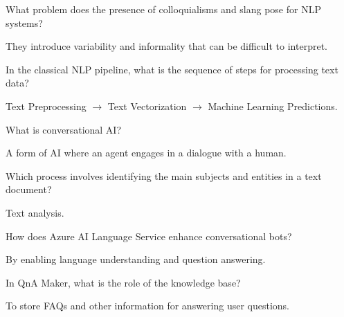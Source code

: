 \begin{qanda}
	\begin{question}
What problem does the presence of colloquialisms and slang pose for NLP systems?
	\end{question}
	\begin{answer}
They introduce variability and informality that can be difficult to interpret.
	\end{answer}
\end{qanda}

\begin{qanda}
	\begin{question}
In the classical NLP pipeline, what is the sequence of steps for processing text data?
	\end{question}
	\begin{answer}
Text Preprocessing $\rightarrow{}$ Text Vectorization $\rightarrow{}$ Machine Learning Predictions.
	\end{answer}
\end{qanda}

\begin{qanda}
	\begin{question}
What is conversational AI?
	\end{question}
	\begin{answer}
A form of AI where an agent engages in a dialogue with a human.
	\end{answer}
\end{qanda}

\begin{qanda}
	\begin{question}
Which process involves identifying the main subjects and entities in a text document?
	\end{question}
	\begin{answer}
Text analysis.
	\end{answer}
\end{qanda}

\begin{qanda}
	\begin{question}
How does Azure AI Language Service enhance conversational bots?
	\end{question}
	\begin{answer}
By enabling language understanding and question answering.
	\end{answer}
\end{qanda}

\begin{qanda}
	\begin{question}
In QnA Maker, what is the role of the knowledge base?
	\end{question}
	\begin{answer}
To store FAQs and other information for answering user questions.
	\end{answer}
\end{qanda}


